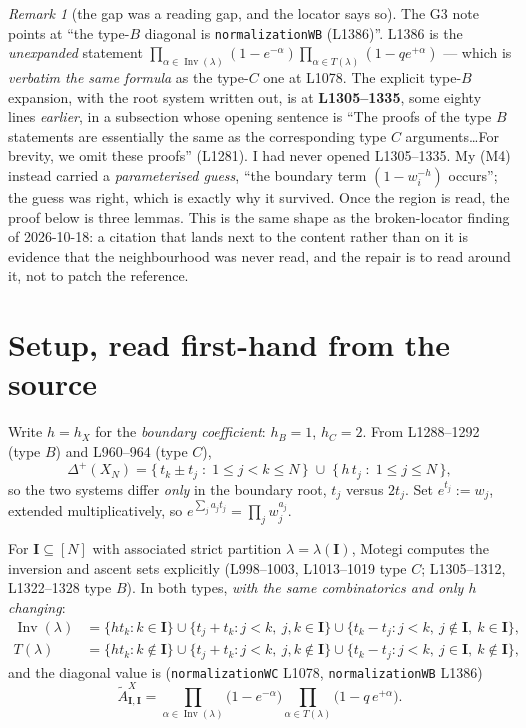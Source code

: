 \documentclass[11pt]{article}
\theoremstyle{definition}
\theoremstyle{remark}
\newtheorem{rem}[thm]{Remark}
\DeclareMathOperator{\Inv}{Inv}
\newcommand{\At}{\widetilde{A}}
\newcommand{\bI}{\mathbf{I}}
\begin{document}
\begin{rem}[the gap was a reading gap, and the locator says so]
\label{rem:locator}
The G3 note points at ``the type-$B$ diagonal is \texttt{normalizationWB} (L1386)''.
L1386 is the \emph{unexpanded} statement
$\prod_{\alpha\in\Inv(\lambda)}(1-e^{-\alpha})\prod_{\alpha\in T(\lambda)}(1-qe^{+\alpha})$
--- which is \emph{verbatim the same formula} as the type-$C$ one at L1078.  The
explicit type-$B$ expansion, with the root system written out, is at
\textbf{L1305--1335}, some eighty lines \emph{earlier}, in a subsection whose opening
sentence is ``The proofs of the type $B$ statements are essentially the same as the
corresponding type $C$ arguments\ldots For brevity, we omit these proofs'' (L1281).
I had never opened L1305--1335.  My (M4) instead carried a \emph{parameterised guess},
``the boundary term $(1-w_i^{-h})$ occurs''; the guess was right, which is exactly why
it survived.  Once the region is read, the proof below is three lemmas.
This is the same shape as the broken-locator finding of 2026-10-18: a citation that
lands next to the content rather than on it is evidence that the neighbourhood was
never read, and the repair is to read around it, not to patch the reference.
\end{rem}

\section{Setup, read first-hand from the source}

Write $h=h_X$ for the \emph{boundary coefficient}: $h_B=1$, $h_C=2$.  From L1288--1292
(type $B$) and L960--964 (type $C$),
\[
  \Delta^{+}(X_N)=\{\,t_k\pm t_j \;:\; 1\le j<k\le N\,\}\;\cup\;\{\,h\,t_j \;:\; 1\le j\le N\,\},
\]
so the two systems differ \emph{only} in the boundary root, $t_j$ versus $2t_j$.  Set
$e^{t_j}:=w_j$, extended multiplicatively, so $e^{\sum_j a_jt_j}=\prod_j w_j^{a_j}$.

For $\bI\subseteq[N]$ with associated strict partition $\lambda=\lambda(\bI)$, Motegi
computes the inversion and ascent sets explicitly (L998--1003, L1013--1019 type $C$;
L1305--1312, L1322--1328 type $B$).  In both types, \emph{with the same combinatorics
and only $h$ changing}:
\begin{align}
  \Inv(\lambda)&=\{h t_k : k\in\bI\}
   \cup\{t_j+t_k : j<k,\ j,k\in\bI\}
   \cup\{t_k-t_j : j<k,\ j\notin\bI,\ k\in\bI\},
  \label{eq:inv}\\
  T(\lambda)&=\{h t_k : k\notin\bI\}
   \cup\{t_j+t_k : j<k,\ j,k\notin\bI\}
   \cup\{t_k-t_j : j<k,\ j\in\bI,\ k\notin\bI\},
  \label{eq:T}
\end{align}
and the diagonal value is (\texttt{normalizationWC} L1078, \texttt{normalizationWB} L1386)
\begin{equation}
  \At^{X}_{\bI,\bI}
  =\prod_{\alpha\in\Inv(\lambda)}\bigl(1-e^{-\alpha}\bigr)
   \prod_{\alpha\in T(\lambda)}\bigl(1-q\,e^{+\alpha}\bigr).
  \label{eq:diag}
\end{equation}
\end{document}
